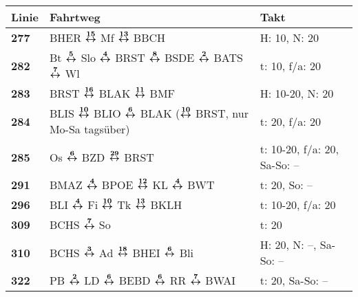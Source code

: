 \begin{minipage}[t]{0.05\textwidth}
\phantom{Tor}
\end{minipage}
\else
\begin{minipage}[t]{0.05\textwidth}
\phantom{Tor}
\end{minipage}
\begin{minipage}[t]{0.45\textwidth}
\begin{tabular}{>{\bfseries}L{1.2cm}L{9.0cm}L{3.0cm}}
{\bfseries Linie} & {\bfseries Fahrtweg} & {\bfseries Takt} \\
\hline
\bus{} 277    & BHER $\boldsymbol{\overset{15}{\leftrightarrow}}$ Mf $\boldsymbol{\overset{13}{\leftrightarrow}}$ BBCH                                                                                                                              & H: 10, N: 20               \\
\bus{} 282    & Bt $\boldsymbol{\overset{5}{\leftrightarrow}}$ Slo $\boldsymbol{\overset{4}{\leftrightarrow}}$ BRST $\boldsymbol{\overset{8}{\leftrightarrow}}$ BSDE $\boldsymbol{\overset{2}{\leftrightarrow}}$ BATS $\boldsymbol{\overset{7}{\leftrightarrow}}$ Wl                                                                                & t: 10, f/a: 20             \\
\bus{} 283    & BRST $\boldsymbol{\overset{16}{\leftrightarrow}}$ BLAK $\boldsymbol{\overset{11}{\leftrightarrow}}$ BMF                                                                                                                             & H: 10-20, N: 20            \\
\bus{} 284    & BLIS $\boldsymbol{\overset{10}{\leftrightarrow}}$ BLIO $\boldsymbol{\overset{6}{\leftrightarrow}}$ BLAK ($\boldsymbol{\overset{10}{\leftrightarrow}}$ BRST, nur Mo-Sa tagsüber)                                                                                     & t: 20, f/a: 20             \\
\bus{} 285    & Os $\boldsymbol{\overset{6}{\leftrightarrow}}$ BZD $\boldsymbol{\overset{29}{\leftrightarrow}}$ BRST                                                                                                                                & t: 10-20, f/a: 20, Sa-So: -- \\
\bus{} 291    & BMAZ $\boldsymbol{\overset{4}{\leftrightarrow}}$ BPOE $\boldsymbol{\overset{12}{\leftrightarrow}}$ KL $\boldsymbol{\overset{4}{\leftrightarrow}}$ BWT                                                                                                               & t: 20, So: --              \\
\bus{} 296    & BLI $\boldsymbol{\overset{4}{\leftrightarrow}}$ Fi $\boldsymbol{\overset{10}{\leftrightarrow}}$ Tk $\boldsymbol{\overset{13}{\leftrightarrow}}$ BKLH                                                                                                                & t: 10-20, f/a: 20          \\
\bus{} 309    & BCHS $\boldsymbol{\overset{7}{\leftrightarrow}}$ So                                                                                                                                                 & t: 20                      \\
\bus{} 310    & BCHS $\boldsymbol{\overset{3}{\leftrightarrow}}$ Ad $\boldsymbol{\overset{18}{\leftrightarrow}}$ BHEI $\boldsymbol{\overset{6}{\leftrightarrow}}$ Bli                                                                                                               & H: 20, N: --, Sa-So: --    \\
\bus{} 322    & PB $\boldsymbol{\overset{2}{\leftrightarrow}}$ LD $\boldsymbol{\overset{6}{\leftrightarrow}}$ BEBD $\boldsymbol{\overset{6}{\leftrightarrow}}$ RR $\boldsymbol{\overset{7}{\leftrightarrow}}$ BWAI                                                                                                  & t: 20, Sa-So: --           \\
\hline
\end{tabular}
\end{minipage}
